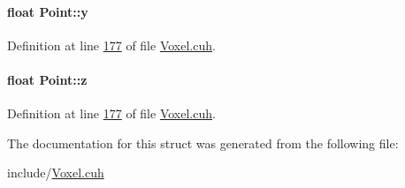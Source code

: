 \paragraph[{\texorpdfstring{y}{y}}]{\setlength{\rightskip}{0pt plus 5cm}float Point\+::y}\hypertarget{structPoint_a6101960c8d2d4e8ea1d32c9234bbeb8d}{}\label{structPoint_a6101960c8d2d4e8ea1d32c9234bbeb8d}


Definition at line \hyperlink{Voxel_8cuh_source_l00177}{177} of file \hyperlink{Voxel_8cuh_source}{Voxel.\+cuh}.

\paragraph[{\texorpdfstring{z}{z}}]{\setlength{\rightskip}{0pt plus 5cm}float Point\+::z}\hypertarget{structPoint_a9a666531e0e99adff132be93d2407d0c}{}\label{structPoint_a9a666531e0e99adff132be93d2407d0c}


Definition at line \hyperlink{Voxel_8cuh_source_l00177}{177} of file \hyperlink{Voxel_8cuh_source}{Voxel.\+cuh}.



The documentation for this struct was generated from the following file\+:\begin{DoxyCompactItemize}
\item 
include/\hyperlink{Voxel_8cuh}{Voxel.\+cuh}\end{DoxyCompactItemize}
